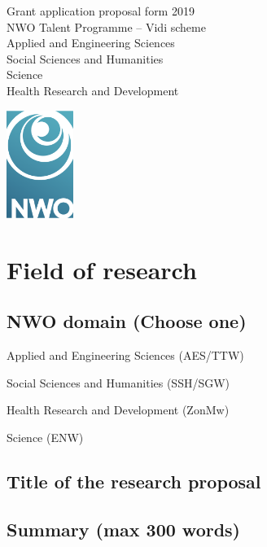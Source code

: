 \documentclass[10pt]{article}
\newcommand{\cmark}{\ding{51}}%
\newcommand{\done}{\rlap{\color{sectionblue}$\square$}{\raisebox{2pt}{\large\hspace{1pt}\cmark}}\hspace{-2.5pt}}
\begin{document}
	
	\noindent
	\begin{minipage}{.85\linewidth}
		\color{headerblue}
		{\rmfamily\fontsize{20}{20}\selectfont Grant application proposal form 2019}\\[0.3cm]
		{\rmfamily\fontsize{15}{15}\selectfont NWO Talent Programme -- Vidi scheme}\\[0.25cm]
		{\rmfamily\fontsize{11}{11}\selectfont
		Applied and Engineering Sciences\\
		Social Sciences and Humanities\\
		Science\\
		Health Research and Development}
	\end{minipage}%
	\begin{minipage}{.15\linewidth}
		\includegraphics[height=3.5cm]{NWO_logo}
	\end{minipage}
	
	\section{Field of research}
	
	\subsection{NWO domain (Choose one)}
	\begin{todolist}
		\setlength\itemsep{0em}
		\item Applied and Engineering Sciences (AES/TTW)
		\item Social Sciences and Humanities (SSH/SGW)
		\item Health Research and Development (ZonMw)
		\item[\done] Science (ENW)
	\end{todolist}
	
	\subsection{Title of the research proposal}
	
	\subsection{Summary (max 300 words)}
	
\end{document}
